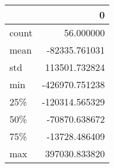 \begin{tabular}{lr}
\toprule
{} &              0 \\
\midrule
count &      56.000000 \\
mean  &  -82335.761031 \\
std   &  113501.732824 \\
min   & -426970.751238 \\
25\%   & -120314.565329 \\
50\%   &  -70870.638672 \\
75\%   &  -13728.486409 \\
max   &  397030.833820 \\
\bottomrule
\end{tabular}
